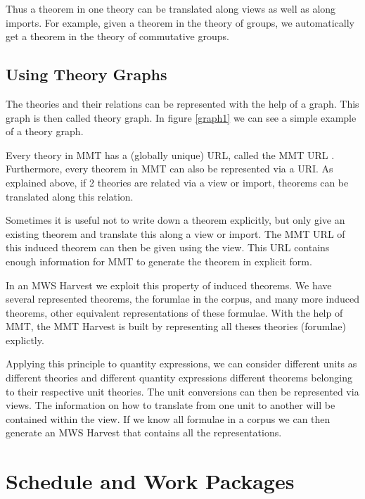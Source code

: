 \documentclass[11pt]{article}
\begin{document}
Thus a theorem in one theory can be translated along views as well as along imports. For example, given a theorem in the theory of groups, we automatically get a theorem in the theory of commutative groups.

\subsection{Using Theory Graphs}
\label{sec:mws:tg}

The theories and their relations can be represented with the help of a graph. This graph is then called theory graph. In figure \ref{graph1} we can see a simple example of a theory graph.



Every theory in MMT has a (globally unique) URL, called the MMT URL . Furthermore, every theorem in MMT can also be represented via a URI. As explained above, if 2 theories are related via a view or import, theorems can be translated along this relation.

Sometimes it is useful not to write down a theorem explicitly, but only give an existing theorem and translate this along a view or import. The MMT URL of this induced theorem can then be given using the view. This URL contains enough information for MMT to generate the theorem in explicit form\cite{IanKohProd:rassmk14}.

In an MWS Harvest we exploit this property of induced theorems. We have several represented theorems, the forumlae in the corpus, and many more induced theorems, other equivalent representations of these formulae. With the help of MMT, the MMT Harvest is built by representing all theses theories (forumlae) explictly.

Applying this principle to quantity expressions, we can consider different units as different theories and different quantity expressions different theorems belonging to their respective unit theories. The unit conversions can then be represented via views. The information on how to translate from one unit to another will be contained within the view. If we know all formulae in a corpus we can then generate an MWS Harvest that contains all the representations. 

\section{Schedule and Work Packages}
\label{sec:timings}
 
\end{document}
